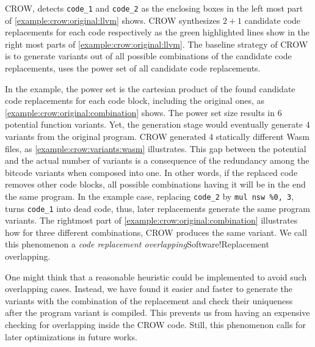 %
    

CROW, detects \texttt{code\_1} and \texttt{code\_2} as the enclosing boxes in the left most part of \autoref{example:crow:original:llvm} shows. CROW synthesizes $2 + 1$ candidate code replacements for each code respectively as the green highlighted lines show in the right most parts of \autoref{example:crow:original:llvm}.
The baseline strategy of CROW is to generate variants out of all possible combinations of the candidate code replacements, \ie uses the power set of all candidate code replacements.

In the example, the power set is the cartesian product of the found candidate code replacements for each code block, including the original ones, as \autoref{example:crow:original:combination} shows. The power set size results in $6$ potential function variants. Yet, the generation stage would eventually generate $4$ variants from the original program. CROW generated 4 statically different Wasm  files, as \autoref{example:crow:variants:wasm} illustrates. This gap between the potential and the actual number of variants is a consequence of the redundancy among the bitcode variants when composed into one. In other words, if the replaced code removes other code blocks, all possible combinations having it will be in the end the same program. In the example case, replacing \texttt{code\_2} by \texttt{mul nsw \%0, 3}, turns \texttt{code\_1} into dead code, thus, later replacements generate the same program variants. The rightmost part of \autoref{example:crow:original:combination} illustrates how for three different combinations, CROW produces the same variant. We call this phenomenon a \emph{code replacement overlapping}{Software!Replacement overlapping}.

%

One might think that a reasonable heuristic could be implemented to avoid such overlapping cases. Instead, we have found it easier and faster to generate the variants with the combination of the replacement and check their uniqueness after the program variant is compiled. This prevents us from having an expensive checking for overlapping inside the CROW code. Still, this phenomenon calls for later optimizations in future works.



